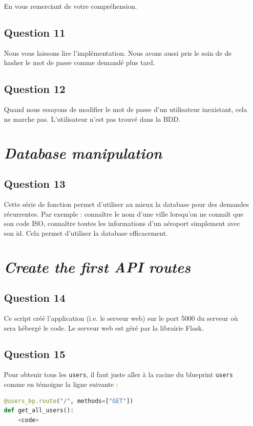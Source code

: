 \documentclass{ceri/sty/rapport}
\begin{document}
En vous remerciant de votre compréhension.

\subsection{Question 11}
Nous vous laissons lire l'implémentation.
Nous avons aussi pris le soin de de hasher le mot de passe comme demandé plus tard.

\subsection{Question 12}
Quand nous essayons de modifier le mot de passe d'un utilisateur inexistant, cela ne marche pas.
L'utilisateur n'est pas trouvé dans la BDD.



\section{\textit{Database manipulation}}
\subsection{Question 13}
Cette série de fonction permet d'utiliser au mieux la database pour des demandes récurrentes.
Par exemple : connaître le nom d'une ville lorsqu'on ne connaît que son code ISO, connaître toutes les informations d'un aéroport simplement avec son id.
Cela permet d'utiliser la database efficacement.

\section{\textit{Create the first API routes}}
\subsection{Question 14}
Ce script créé l'application (i.e. le serveur web) sur le port 5000 du serveur où sera hébergé le code. Le serveur web est géré par la librairie Flask.

\subsection{Question 15}
Pour obtenir tous les \texttt{users}, il faut juste aller à la racine du blueprint \texttt{users} comme en témoigne la ligne suivante :

\begin{lstlisting}[language=python]
@users_bp.route("/", methods=["GET"])
def get_all_users():
    <code>
\end{lstlisting}
\end{document}
